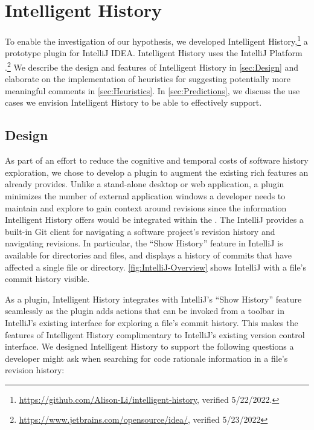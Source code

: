 \chapter{Intelligent History}
\label{ch:Intelligent-History}

To enable the investigation of our hypothesis, we developed Intelligent History,\footnote{\url{https://github.com/Alison-Li/intelligent-history}, verified 5/22/2022.} a prototype plugin for IntelliJ IDEA.
Intelligent History uses the IntelliJ Platform .\footnote{\url{https://www.jetbrains.com/opensource/idea/}, verified 5/23/2022}
We describe the design and features of Intelligent History in \autoref{sec:Design} and elaborate on the implementation of heuristics
for suggesting potentially more meaningful comments in \autoref{sec:Heuristics}.
In \autoref{sec:Predictions}, we discuss the use cases we envision Intelligent History to be able to effectively support.

\section{Design}
\label{sec:Design}

As part of an effort to reduce the cognitive and temporal costs of software history exploration, we chose to develop a plugin to augment the existing rich features an  already provides.
Unlike a stand-alone desktop or web application, a plugin minimizes the number of external application windows a developer needs to maintain and explore to gain context around revisions since the information Intelligent History offers would be integrated within the .
The IntelliJ  provides a built-in Git client  for navigating a software project's revision history and navigating revisions. 
In particular, the ``Show History'' feature in IntelliJ is available for directories and files, and displays a history of commits that have affected a single file or directory.
\autoref{fig:IntelliJ-Overview} shows IntelliJ with a file's commit history visible.

As a plugin, Intelligent History integrates with IntelliJ's ``Show History'' feature seamlessly as the plugin adds actions that can be invoked from a toolbar in IntelliJ's existing interface for exploring a file's commit history. 
This makes the features of Intelligent History complimentary to IntelliJ's existing version control interface.
We designed Intelligent History to support the following questions a developer might ask when searching for code rationale information in a file's revision history:

